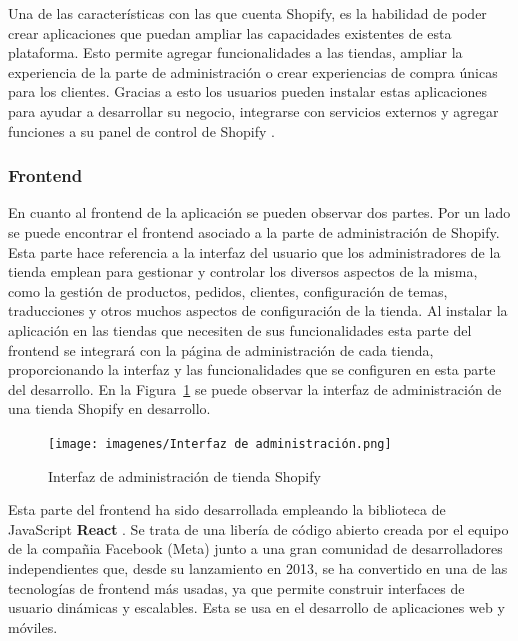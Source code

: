 \documentclass[12pt]{article}
\begin{document}
Una de las características con las que cuenta Shopify, es la habilidad de poder crear aplicaciones que puedan ampliar las capacidades existentes 
de esta plataforma. Esto permite agregar funcionalidades a las tiendas, ampliar la experiencia de la parte de administración
o crear experiencias de compra únicas para los clientes. Gracias a esto los usuarios pueden instalar estas aplicaciones para ayudar a desarrollar
su negocio, integrarse con servicios externos y agregar funciones a su panel de control de Shopify \cite{shopify-dev}. 

\subsubsection{Frontend}
En cuanto al frontend de la aplicación se pueden observar dos partes. 
Por un lado se puede encontrar el frontend asociado a la parte de administración de Shopify. 
Esta parte hace referencia a la interfaz del usuario que los administradores de la tienda emplean para gestionar y controlar los diversos aspectos de
la misma, como la gestión de productos, pedidos, clientes, configuración de temas, traducciones y otros muchos aspectos de configuración de la tienda.
Al instalar la aplicación en las tiendas que necesiten de sus funcionalidades esta parte del frontend se integrará con la página de administración de 
cada tienda, proporcionando la interfaz y las funcionalidades que se configuren en esta parte del desarrollo. En la Figura~\ref{fig:1} se puede observar la 
interfaz de administración de una tienda Shopify en desarrollo.

\begin{figure}[ht]
    \centering
    \texttt{[image: imagenes/Interfaz de administración.png]}
    \caption{\label{fig:1}Interfaz de administración de tienda Shopify}
    \vspace{\fill}
\end{figure}

Esta parte del frontend ha sido desarrollada empleando la biblioteca de JavaScript \textbf{React} \cite{react-pag-1}. Se trata de una libería de código abierto creada por el equipo de la
compañia Facebook (Meta) junto a una gran comunidad de desarrolladores independientes que, desde su lanzamiento en 2013, se ha convertido en una
de las tecnologías de frontend más usadas, ya que permite construir interfaces de usuario dinámicas y escalables. Esta se usa en el desarrollo de aplicaciones web y móviles. 
\end{document}
